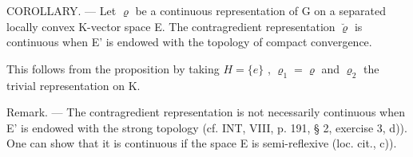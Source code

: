 COROLLARY. --- Let \(\varrho\) be a continuous representation of G on a separated locally convex K-vector space E. The contragredient representation \(\breve{\varrho}\) is continuous when E' is endowed with the topology of compact convergence.

This follows from the proposition by taking \(H = \{e\}\) , \(\varrho_{1} = \varrho\) and \(\varrho_{2}\) the trivial representation on K.

Remark. --- The contragredient representation is not necessarily continuous when E' is endowed with the strong topology (cf. INT, VIII, p. 191, § 2, exercise 3, d)). One can show that it is continuous if the space E is semi-reflexive (loc. cit., c)).

